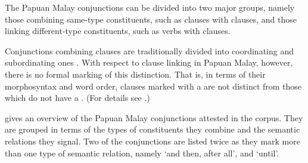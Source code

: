 The Papuan Malay conjunctions can be divided into two major groups, namely those combining same-type constituents, such as clauses with clauses, and those linking dif\-fer\-ent-type constituents, such as verbs with clauses.

Conjunctions combining clauses are traditionally divided into coordinating and subordinating ones \citep[45]{Schachter.2007}. With respect to clause linking in Papuan Malay, however, there is no formal marking of this distinction. That is, in terms of their morphosyntax and word order, clauses marked with a  are not distinct from those which do not have a . (For details see .)

 gives an overview of the Papuan Malay conjunctions attested in the corpus. They are grouped in terms of the types of constituents they combine and the semantic relations they signal. Two of the conjunctions are listed twice as they mark more than one type of semantic relation, namely  ‘and then, after all’, and  ‘until’.

